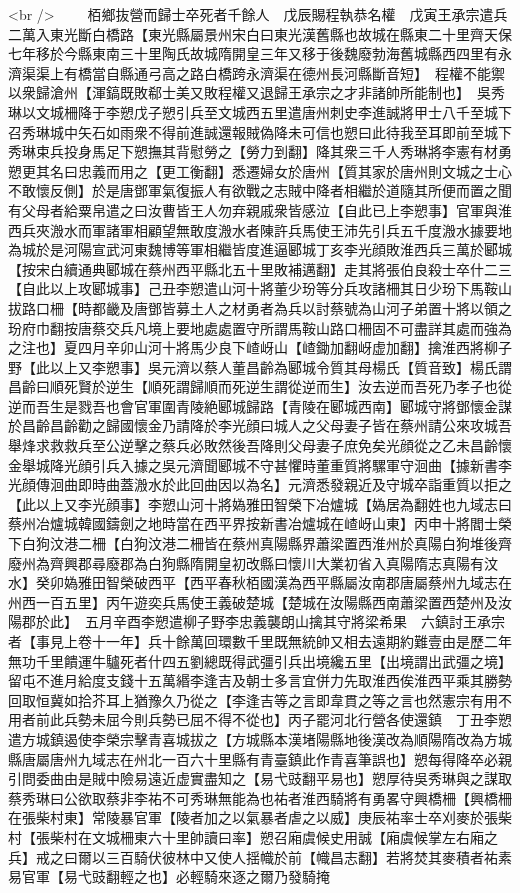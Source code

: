 <br />
　　栢鄉抜營而歸士卒死者千餘人　戊辰賜程執恭名權　戊寅王承宗遣兵二萬入東光斷白橋路【東光縣屬景州宋白曰東光漢舊縣也故城在縣東二十里齊天保七年移於今縣東南三十里陶氏故城隋開皇三年又移于後魏廢勃海舊城縣西四里有永濟渠渠上有橋當自縣通弓高之路白橋跨永濟渠在德州長河縣斷音短】　程權不能禦以衆歸滄州【渾鎬既敗郗士美又敗程權又退歸王承宗之才非諸帥所能制也】　吳秀琳以文城柵降于李愬戊子愬引兵至文城西五里遣唐州刺史李進誠將甲士八千至城下召秀琳城中矢石如雨衆不得前進誠還報賊偽降未可信也愬曰此待我至耳即前至城下秀琳束兵投身馬足下愬撫其背慰勞之【勞力到翻】降其衆三千人秀琳將李憲有材勇愬更其名曰忠義而用之【更工衡翻】悉遷婦女於唐州【質其家於唐州則文城之士心不敢懷反側】於是唐鄧軍氣復振人有欲戰之志賊中降者相繼於道隨其所便而置之聞有父母者給粟帛遣之曰汝曹皆王人勿弃親戚衆皆感泣【自此已上李愬事】官軍與淮西兵夾溵水而軍諸軍相顧望無敢度溵水者陳許兵馬使王沛先引兵五千度溵水據要地為城於是河陽宣武河東魏博等軍相繼皆度進逼郾城丁亥李光顔敗淮西兵三萬於郾城【按宋白續通典郾城在蔡州西平縣北五十里敗補邁翻】走其將張伯良殺士卒什二三【自此以上攻郾城事】己丑李愬遣山河十將董少玢等分兵攻諸柵其日少玢下馬鞍山拔路口柵【時都畿及唐鄧皆募土人之材勇者為兵以討蔡號為山河子弟置十將以領之玢府巾翻按唐蔡交兵凡境上要地處處置守所謂馬鞍山路口柵固不可盡詳其處而強為之注也】夏四月辛卯山河十將馬少良下嵖岈山【嵖鋤加翻岈虚加翻】擒淮西將柳子野【此以上又李愬事】吳元濟以蔡人董昌齡為郾城令質其母楊氏【質音致】楊氏謂昌齡曰順死賢於逆生【順死謂歸順而死逆生謂從逆而生】汝去逆而吾死乃孝子也從逆而吾生是戮吾也會官軍圍青陵絶郾城歸路【青陵在郾城西南】郾城守將鄧懷金謀於昌齡昌齡勸之歸國懷金乃請降於李光顔曰城人之父母妻子皆在蔡州請公來攻城吾舉烽求救救兵至公逆擊之蔡兵必敗然後吾降則父母妻子庶免矣光顔從之乙未昌齡懷金舉城降光顔引兵入據之吳元濟聞郾城不守甚懼時董重質將騾軍守洄曲【據新書李光顔傳洄曲即時曲蓋溵水於此回曲因以為名】元濟悉發親近及守城卒詣重質以拒之【此以上又李光顔事】李愬山河十將媯雅田智榮下冶爐城【媯居為翻姓也九域志曰蔡州冶爐城韓國鑄劍之地時當在西平界按新書冶爐城在嵖岈山東】丙申十將閻士榮下白狗汶港二柵【白狗汶港二柵皆在蔡州真陽縣界蕭梁置西淮州於真陽白狗堆後齊廢州為齊興郡尋廢郡為白狗縣隋開皇初改縣曰懷川大業初省入真陽隋志真陽有汶水】癸卯媯雅田智榮破西平【西平春秋栢國漢為西平縣屬汝南郡唐屬蔡州九域志在州西一百五里】丙午遊奕兵馬使王義破楚城【楚城在汝陽縣西南蕭梁置西楚州及汝陽郡於此】　五月辛酉李愬遣柳子野李忠義襲朗山擒其守將梁希果　六鎮討王承宗者【事見上卷十一年】兵十餘萬回環數千里既無統帥又相去遠期約難壹由是歷二年無功千里饋運牛驢死者什四五劉總既得武彊引兵出境纔五里【出境謂出武彊之境】留屯不進月給度支錢十五萬緡李逢吉及朝士多言宜併力先取淮西俟淮西平乘其勝勢回取恒冀如拾芥耳上猶豫久乃從之【李逢吉等之言即韋貫之等之言也然憲宗有用不用者前此兵勢未屈今則兵勢已屈不得不從也】丙子罷河北行營各使還鎮　丁丑李愬遣方城鎮遏使李榮宗擊青喜城拔之【方城縣本漢堵陽縣地後漢改為順陽隋改為方城縣唐屬唐州九域志在州北一百六十里縣有青臺鎮此作青喜筆誤也】愬每得降卒必親引問委曲由是賊中險易遠近虚實盡知之【易弋豉翻平易也】愬厚待吳秀琳與之謀取蔡秀琳曰公欲取蔡非李祐不可秀琳無能為也祐者淮西騎將有勇畧守興橋柵【興橋柵在張柴村東】常陵暴官軍【陵者加之以氣暴者虐之以威】庚辰祐率士卒刈麥於張柴村【張柴村在文城柵東六十里帥讀曰率】愬召廂虞候史用誠【廂虞候掌左右廂之兵】戒之曰爾以三百騎伏彼林中又使人揺幟於前【幟昌志翻】若將焚其麥積者祐素易官軍【易弋豉翻輕之也】必輕騎來逐之爾乃發騎掩